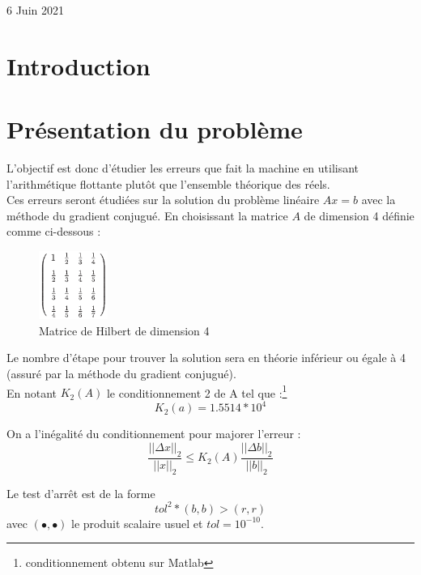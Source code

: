 \documentclass[12,french]{report}
\begin{document}
\begin{titlepage}
\begin{center}
	\vfill
	{\large 6 Juin 2021}
\end{center}
\end{titlepage}

\tableofcontents


\renewcommand{\chaptername}{}
\chapter*{Introduction} %

\chapter{Présentation du problème} %

L'objectif est donc d'étudier les erreurs que fait la machine en utilisant l'arithmétique flottante plutôt que l'ensemble théorique des réels.\\

 Ces erreurs seront étudiées sur la solution du problème linéaire $Ax=b$ avec la méthode du gradient conjugué. En choisissant la matrice $A$ de dimension 4 définie comme ci-dessous :\\

\begin{figure}[H]
	\center
	\includegraphics[width=0.2\textwidth]{./Images/H_4}
	\caption{Matrice de Hilbert de dimension 4}
\end{figure}

Le nombre d'étape pour trouver la solution sera en théorie inférieur ou égale à 4 (assuré par la méthode du gradient conjugué).\\

En notant $K_2(A)$ le conditionnement 2 de A tel que :\footnote{conditionnement obtenu sur Matlab}
$$K_2(a)= 1.5514*10^4$$

On a l'inégalité du conditionnement pour majorer l'erreur :
$$\frac{||\Delta x||_{2}}{||x||_2}\leq K_2(A)\frac{||\Delta b||_{2}}{||b||_2}$$

Le test d'arrêt est de la forme $$tol^2*(b,b) > (r,r) $$
avec $(\bullet,\bullet)$ le produit scalaire usuel et $tol=10^{-10}$.\\
\end{document}

